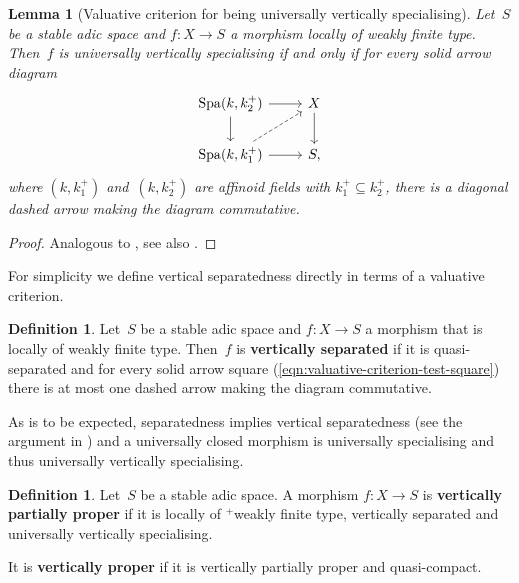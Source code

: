 \documentclass[a4paper,twoside,11pt,reqno]{amsart}
\DeclareMathOperator{\Spa}{Spa}
\newtheorem{lem}[thm]{Lemma}
\theoremstyle{definition}
\newtheorem{defi}[thm]{Definition}
\numberwithin{equation}{subsection}
\begin{document}
\begin{lem}[Valuative criterion for being universally vertically specialising] \label{valuative-criterion-separatednes}
    Let~$S$ be a stable adic space and $f \colon  X \to S$ a morphism locally of weakly finite type.
    Then~$f$ is universally vertically specialising if and only if for every solid arrow diagram 
    \begin{equation} \label{eqn:valuative-criterion-test-square} 
        \begin{tikzcd}
            \Spa(k, k_2^+) \ar[r] \ar[d] & X \ar[d] \\
            \Spa(k, k_1^+) \ar[r] \ar[ur,dashed] & S,
        \end{tikzcd}
    \end{equation}
    where $(k,k_1^+)$ and~$(k,k_2^+)$ are affinoid fields with $k_1^+ \subseteq k_2^+$, there is a diagonal dashed arrow making the diagram commutative.
\end{lem}

\begin{proof}
    Analogous to \cite[Proposition~1.3.8]{HuberBook}, see also \cite[Remark~3.5]{Solodov-vertical-compactification}. 
\end{proof}

For simplicity we define vertical separatedness directly in terms of a valuative criterion.

\begin{defi}
    Let~$S$ be a stable adic space and $f \colon  X \to S$ a morphism that is locally of weakly finite type.
    Then~$f$ is {\bf vertically separated} if it is quasi-separated and for every solid arrow square (\ref{eqn:valuative-criterion-test-square}) there is at most one dashed arrow making the diagram commutative.
\end{defi}

As is to be expected, separatedness implies vertical separatedness (see the argument in \cite[Proposition~1.3.8]{HuberBook}) and a universally closed morphism is universally specialising and thus universally vertically specialising.

\begin{defi}
    Let~$S$ be a stable adic space.
    A morphism $f \colon  X \to S$ is {\bf vertically partially proper} if it is locally of ${}^+$weakly finite type, vertically separated and universally vertically specialising.

    It is {\bf vertically proper} if it is vertically partially proper and quasi-compact.
\end{defi}
\end{document}
